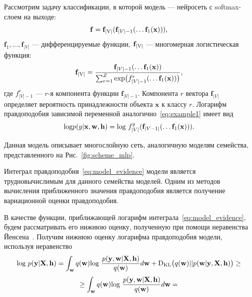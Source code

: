 \begin{example}
Рассмотрим задачу классификации, в которой модель --- нейросеть с softmax-слоем на выходе:
\begin{equation}
\label{eq:softmax_example}
\mathbf{f} = \mathbf{f}_\textnormal{|V|}(\mathbf{f}_{|V|-1}(\dots \mathbf{f}_1(\mathbf{x}))),
\end{equation}
$\mathbf{f}_1, \dots, \mathbf{f}_{|V|}$ --- дифференцируемые функции, $\mathbf{f}_\textnormal{|V|}$ --- многомерная логистическая функция:
\begin{equation}
\label{eq:proba_softmax}
	\mathbf{f}_\textnormal{|V|} = \frac{\mathbf{f}_{|V|-1}(\dots \mathbf{f}_1(\mathbf{x}))}{\sum_{r=1}^Z \textnormal{exp}\bigl( {f}^{r}_{|V|-1}(\dots \mathbf{f}_1(\mathbf{x})) \bigr)},
\end{equation}
где ${f}_{|V|-1}^{r}$ --- $r$-я компонента функции $\mathbf{f}_{|V|-1}$. Компонента $r$ вектора $\mathbf{f}_{|V|}$ определяет вероятность принадлежности объекта $\mathbf{x}$ к классу $r$. Логарифм правдоподобия зависимой переменной аналогично~\eqref{eq:example1} имеет вид
\[
	\textnormal{log} p({y}|\mathbf{x}, \mathbf{w}, \mathbf{h}) =  \textnormal{log}~{f}^{y}_{|V|} (\mathbf{f}_{|V-1|}(\dots \mathbf{f}_1(\mathbf{x}))).
\]

Данная модель описывает многослойную сеть, аналогичную моделям семейства, представленного на Рис.~\ref{fig:scheme_mlp}.
\end{example}

Интеграл правдоподобия~\eqref{eq:model_evidence} модели является трудновычислимым для данного семейства моделей. Одним из методов вычисления приближенного значения правдоподобия является получение вариационной оценки правдоподобия.  


{В качестве функции, приближающей логарифм интеграла~\eqref{eq:model_evidence}, будем рассматривать его нижнюю оценку, полученную при помощи неравенства Йенсена~\cite{Bishop}. Получим нижнюю оценку логарифма правдоподобия модели, используя неравенство}
\begin{equation} 
\label{eq:var_elbo}
\textnormal{log}~p(\mathbf{y}|\mathbf{X},\mathbf{h})  = \int_{\mathbf{w}} q(\mathbf{w})\textnormal{log}~\frac{p(\mathbf{y},\mathbf{w}|\mathbf{X},\mathbf{h})}{q(\mathbf{w})}d\mathbf{w} + \textnormal{D}_\textnormal{KL}  \bigl(q(\mathbf{w})||p(\mathbf{w}|\mathbf{y}, \mathbf{X}, \mathbf{h})\bigr) \geq	
\end{equation} 
$$
\geq \int_{\mathbf{w}} q(\mathbf{w})\textnormal{log}~\frac{p(\mathbf{y},\mathbf{w}|\mathbf{X},\mathbf{h})}{q(\mathbf{w})}d\mathbf{w} =
$$

